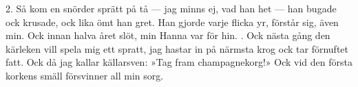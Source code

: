 \setlength{\columnsep}{1cm}
\begin{multicols}{2}
2.  Så kom en snörder sprätt på tå —
    jag minns ej, vad han het —
    han bugade ock krusade,
    ock lika ömt han gret.
    Han gjorde varje flicka yr,
    förstår sig, även min.
    Ock innan halva året slöt,
    min Hanna var för hin.
\vfill{}.  Ock nästa gång den kärleken
    vill spela mig ett spratt,
    jag hastar in på närmsta krog
    ock tar förnuftet fatt.
    Ock då jag kallar källarsven:
    »Tag fram champagnekorg!»
    Ock vid den första korkens smäll
    försvinner all min sorg.
\end{multicols}